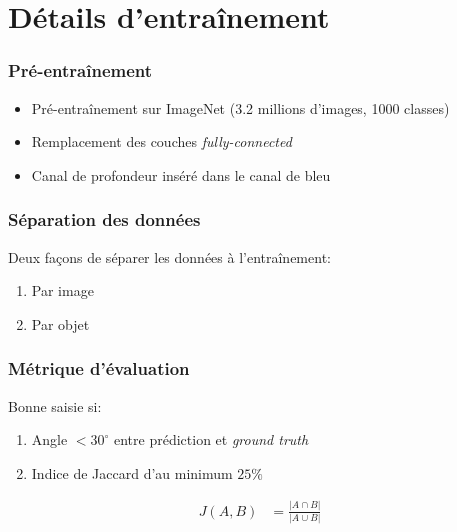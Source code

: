 \documentclass{beamer}
\begin{document}
\section{Détails d'entraînement}
\begin{frame}
  \frametitle{Pré-entraînement}
  \begin{itemize}
  \item Pré-entraînement sur ImageNet (3.2 millions d'images, 1000 classes)
  \item Remplacement des couches \emph{fully-connected}
  \item Canal de profondeur inséré dans le canal de bleu
  \end{itemize}
  
\end{frame}

\begin{frame}
  \frametitle{Séparation des données}
  Deux façons de séparer les données à l'entraînement:
  \begin{enumerate}
  \item Par image
  \item Par objet
  \end{enumerate}
\end{frame}

\begin{frame}
  \frametitle{Métrique d'évaluation}
  Bonne saisie si:
  \begin{enumerate}
  \item Angle $< 30^{\circ}$ entre prédiction et \emph{ground truth}
  \item Indice de Jaccard d'au minimum $25\%$
  \end{enumerate}
  \begin{align*}
    \label{eq:jaccard}
    J(A,B) &= \frac{|A \cap B|}{|A \cup B|}\\
  \end{align*}
\end{frame}
\end{document}
